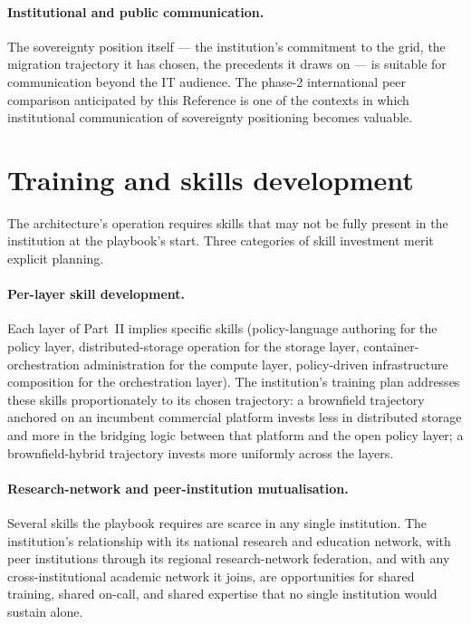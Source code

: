 \paragraph{Institutional and public communication.} The
sovereignty position itself --- the institution's commitment to
the grid, the migration trajectory it has chosen, the precedents
it draws on --- is suitable for communication beyond the IT
audience. The phase-2 international peer comparison anticipated
by this Reference is one of the contexts in which institutional
communication of sovereignty positioning becomes valuable.

\section{Training and skills development}
\label{sec:cc-training}

The architecture's operation requires skills that may not be
fully present in the institution at the playbook's start. Three
categories of skill investment merit explicit planning.

\paragraph{Per-layer skill development.} Each layer of Part~II
implies specific skills (policy-language authoring for the policy
layer, distributed-storage operation for the storage layer,
container-orchestration administration for the compute layer,
policy-driven infrastructure composition for the orchestration
layer). The institution's training plan addresses these skills
proportionately to its chosen trajectory: a brownfield trajectory
anchored on an incumbent commercial platform invests less in
distributed storage and more in the bridging logic between that
platform and the open policy layer; a brownfield-hybrid trajectory
invests more uniformly across the layers.

\paragraph{Research-network and peer-institution mutualisation.}
Several skills the playbook requires are scarce in any single
institution. The institution's relationship with its national
research and education network, with peer institutions through
its regional research-network federation, and
with any cross-institutional academic network it joins, are
opportunities for shared
training, shared on-call, and shared expertise that no single
institution would sustain alone.

